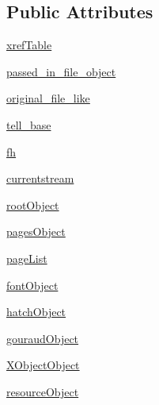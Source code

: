 \subsection*{Public Attributes}
\begin{DoxyCompactItemize}
\item 
\hyperlink{classmatplotlib_1_1backends_1_1backend__pdf_1_1PdfFile_a15868c1e4e19f2c23a7b64eccacef140}{xref\+Table}
\item 
\hyperlink{classmatplotlib_1_1backends_1_1backend__pdf_1_1PdfFile_a4efd688dc10963d558eae7d4415020ff}{passed\+\_\+in\+\_\+file\+\_\+object}
\item 
\hyperlink{classmatplotlib_1_1backends_1_1backend__pdf_1_1PdfFile_a7f667c05df48f07fc3b849610e6a2adc}{original\+\_\+file\+\_\+like}
\item 
\hyperlink{classmatplotlib_1_1backends_1_1backend__pdf_1_1PdfFile_aef182bf7d7f908532639b49bfc432767}{tell\+\_\+base}
\item 
\hyperlink{classmatplotlib_1_1backends_1_1backend__pdf_1_1PdfFile_a530b0df8b6dff44182953bfbef7bb7a0}{fh}
\item 
\hyperlink{classmatplotlib_1_1backends_1_1backend__pdf_1_1PdfFile_af89c10e12691742d76cec092a2efa6b7}{currentstream}
\item 
\hyperlink{classmatplotlib_1_1backends_1_1backend__pdf_1_1PdfFile_a59baf3221f7ce4a32dc3d47175f7dd39}{root\+Object}
\item 
\hyperlink{classmatplotlib_1_1backends_1_1backend__pdf_1_1PdfFile_acc32def9f5138469075a7dcfa8556dd9}{pages\+Object}
\item 
\hyperlink{classmatplotlib_1_1backends_1_1backend__pdf_1_1PdfFile_a084339f59e6ed799fc13c7a1549ce04b}{page\+List}
\item 
\hyperlink{classmatplotlib_1_1backends_1_1backend__pdf_1_1PdfFile_ad504a7e17366cb18c470e88dbdd9009d}{font\+Object}
\item 
\hyperlink{classmatplotlib_1_1backends_1_1backend__pdf_1_1PdfFile_a2a2bb518dd2c276513f4a26b041ef918}{hatch\+Object}
\item 
\hyperlink{classmatplotlib_1_1backends_1_1backend__pdf_1_1PdfFile_ac8736da93d2ba5e17bd9c691b6ebc157}{gouraud\+Object}
\item 
\hyperlink{classmatplotlib_1_1backends_1_1backend__pdf_1_1PdfFile_a325a661c08336917644e6b3ddf15c6f8}{X\+Object\+Object}
\item 
\hyperlink{classmatplotlib_1_1backends_1_1backend__pdf_1_1PdfFile_a503c08378aa2210b6a2cbcdc1967292e}{resource\+Object}
\item 

\end{DoxyCompactItemize}
